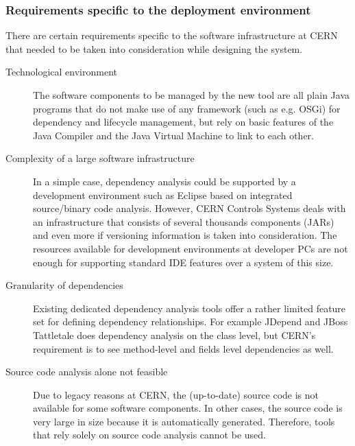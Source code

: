 \subsubsection{Requirements specific to the deployment environment}
There are certain requirements specific to the software infrastructure at CERN
that needed to be taken into consideration while designing the system.

\begin{description}
\item[Technological environment] The software components to be managed by the
new tool are all plain Java programs that do not make use of any framework (such
as e.g. OSGi) for dependency and lifecycle management, but rely on basic
features of the Java Compiler and the Java Virtual Machine to link to each
other.
 
\item[Complexity of a large software infrastructure] In a simple case,
dependency analysis could be supported by a development environment such as
Eclipse based on integrated source/binary code analysis. However, CERN Controls
Systems deals with an infrastructure that consists of several thousands
components (JARs) and even more if versioning information is taken into
consideration. The resources available for development environments at developer
PCs are not enough for supporting standard IDE features over a system of this
size.
 
\item[Granularity of dependencies] Existing dedicated dependency analysis
tools offer a rather limited feature set for defining dependency relationships.
For example JDepend \cite{JDepend} and JBoss Tattletale \cite{Tattletale} does
dependency analysis on the class level, but CERN's requirement is to see
method-level and fields level dependencies as well.

\item[Source code analysis alone not feasible] Due to legacy reasons at CERN,
the (up-to-date) source code is not available for some software components. In
other cases, the source code is very large in size because it is automatically
generated. Therefore, tools that rely solely on source code analysis cannot be
used.

\end{description}

